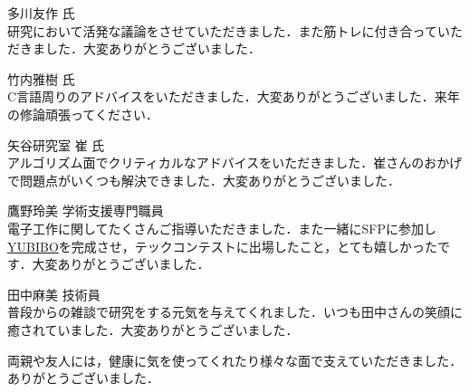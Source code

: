 多川友作 氏\\
研究において活発な議論をさせていただきました．また筋トレに付き合っていただきました．大変ありがとうございました．

竹内雅樹 氏\\
C言語周りのアドバイスをいただきました．大変ありがとうございました．来年の修論頑張ってください．

矢谷研究室 崔 氏\\
アルゴリズム面でクリティカルなアドバイスをいただきました．崔さんのおかげで問題点がいくつも解決できました．大変ありがとうございました．

鷹野玲美 学術支援専門職員\\
電子工作に関してたくさんご指導いただきました．また一緒にSFPに参加し\href{https://qiita.com/yumion/items/b7fa89f29504cab1f123}{YUBIBO}を完成させ，テックコンテストに出場したこと，とても嬉しかったです．大変ありがとうございました．

田中麻美 技術員\\
普段からの雑談で研究をする元気を与えてくれました．いつも田中さんの笑顔に癒されていました．大変ありがとうございました．

\vspace{12pt}
両親や友人には，健康に気を使ってくれたり様々な面で支えていただきました．ありがとうございました．
